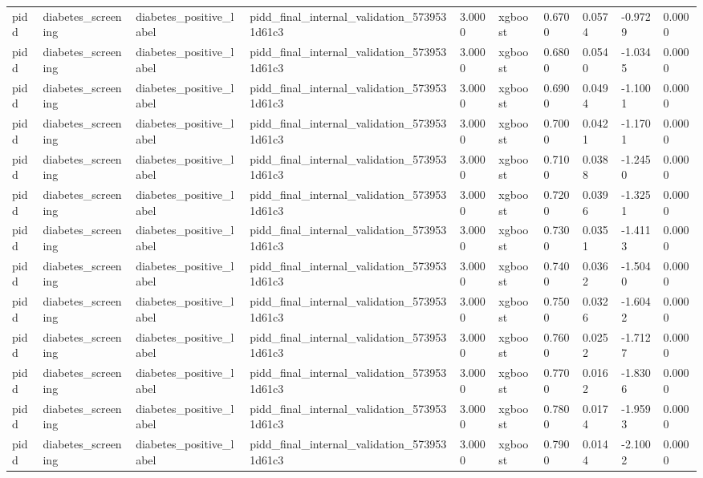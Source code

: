 \begin{tabular}{llllllllll}
pidd & diabetes\_screening & diabetes\_positive\_label & pidd\_final\_internal\_validation\_5739531d61c3 & 3.0000 & xgboost & 0.6700 & 0.0574 & -0.9729 & 0.0000 \\
pidd & diabetes\_screening & diabetes\_positive\_label & pidd\_final\_internal\_validation\_5739531d61c3 & 3.0000 & xgboost & 0.6800 & 0.0540 & -1.0345 & 0.0000 \\
pidd & diabetes\_screening & diabetes\_positive\_label & pidd\_final\_internal\_validation\_5739531d61c3 & 3.0000 & xgboost & 0.6900 & 0.0494 & -1.1001 & 0.0000 \\
pidd & diabetes\_screening & diabetes\_positive\_label & pidd\_final\_internal\_validation\_5739531d61c3 & 3.0000 & xgboost & 0.7000 & 0.0421 & -1.1701 & 0.0000 \\
pidd & diabetes\_screening & diabetes\_positive\_label & pidd\_final\_internal\_validation\_5739531d61c3 & 3.0000 & xgboost & 0.7100 & 0.0388 & -1.2450 & 0.0000 \\
pidd & diabetes\_screening & diabetes\_positive\_label & pidd\_final\_internal\_validation\_5739531d61c3 & 3.0000 & xgboost & 0.7200 & 0.0396 & -1.3251 & 0.0000 \\
pidd & diabetes\_screening & diabetes\_positive\_label & pidd\_final\_internal\_validation\_5739531d61c3 & 3.0000 & xgboost & 0.7300 & 0.0351 & -1.4113 & 0.0000 \\
pidd & diabetes\_screening & diabetes\_positive\_label & pidd\_final\_internal\_validation\_5739531d61c3 & 3.0000 & xgboost & 0.7400 & 0.0362 & -1.5040 & 0.0000 \\
pidd & diabetes\_screening & diabetes\_positive\_label & pidd\_final\_internal\_validation\_5739531d61c3 & 3.0000 & xgboost & 0.7500 & 0.0326 & -1.6042 & 0.0000 \\
pidd & diabetes\_screening & diabetes\_positive\_label & pidd\_final\_internal\_validation\_5739531d61c3 & 3.0000 & xgboost & 0.7600 & 0.0252 & -1.7127 & 0.0000 \\
pidd & diabetes\_screening & diabetes\_positive\_label & pidd\_final\_internal\_validation\_5739531d61c3 & 3.0000 & xgboost & 0.7700 & 0.0162 & -1.8306 & 0.0000 \\
pidd & diabetes\_screening & diabetes\_positive\_label & pidd\_final\_internal\_validation\_5739531d61c3 & 3.0000 & xgboost & 0.7800 & 0.0174 & -1.9593 & 0.0000 \\
pidd & diabetes\_screening & diabetes\_positive\_label & pidd\_final\_internal\_validation\_5739531d61c3 & 3.0000 & xgboost & 0.7900 & 0.0144 & -2.1002 & 0.0000 \\

\end{tabular}
